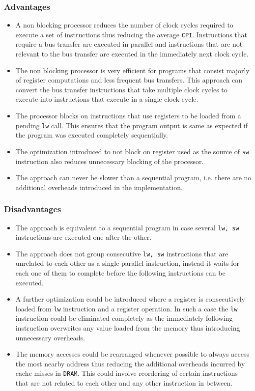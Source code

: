 \documentclass[hidelinks,12pt]{article}
\begin{document}
\subsubsection{Advantages}
\begin{itemize}
    \item A non blocking processor reduces the number of clock cycles required to execute a set of instructions thus reducing the average \verb|CPI|.
          Instructions that require a bus transfer are executed in parallel and instructions that are not relevant to the bus transfer are executed in the immediately next clock cycle.
    \item The non blocking processor is very efficient for programs that consist majorly of register computations and less frequent bus transfers. This approach can convert the bus transfer instructions that take multiple clock cycles to execute into instructions that execute in a single clock cycle.
    \item The processor blocks on instructions that use registers to be loaded from a pending \verb|lw| call. This ensures that the program output is same as expected if the program was executed completely sequentially.
    \item The optimization introduced to not block on register used as the source of \verb|sw| instruction also reduces unnecessary blocking of the processor.
    \item The approach can never be slower than a sequential program, i.e. there are no additional overheads introduced in the implementation.
\end{itemize}

\subsubsection{Disadvantages}
\begin{itemize}
    \item The approach is equivalent to a sequential program in case several \verb|lw, sw| instructions are executed one after the other.
    \item The approach does not group consecutive \verb|lw, sw| instructions that are unrelated to each other as a single parallel instruction, instead it waits for each one of them to complete before the following instructions can be executed.
    \item A further optimization could be introduced where a register is consecutively loaded from \verb|lw| instruction and a register operation. In such a case the \verb|lw| instruction could be eliminated completely as the immediately following instruction overwrites any value loaded from the memory thus introducing unnecessary overheads.
    \item The memory accesses could be rearranged whenever possible to always access the most nearby address thus reducing the additional overheads incurred by cache misses in \verb|DRAM|. This could involve reordering of certain instructions that are not related to each other and any other instruction in between.
\end{itemize}
\end{document}

